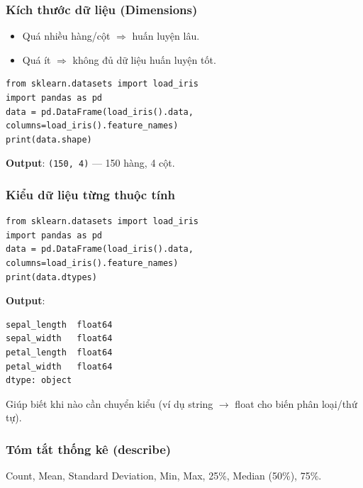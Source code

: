 \subsubsection{Kích thước dữ liệu (Dimensions)}

\begin{ynghia}[title={Vì sao cần biết số hàng/cột}]
\begin{itemize}
  \item Quá nhiều hàng/cột $\Rightarrow$ huấn luyện lâu.
  \item Quá ít $\Rightarrow$ không đủ dữ liệu huấn luyện tốt.
\end{itemize}
\end{ynghia}

\begin{vidu}[title={shape trên Iris}]
\begin{lstlisting}
from sklearn.datasets import load_iris
import pandas as pd
data = pd.DataFrame(load_iris().data, columns=load_iris().feature_names)
print(data.shape)
\end{lstlisting}
\textbf{Output}: \texttt{(150, 4)} --- 150 hàng, 4 cột.
\end{vidu}

\subsubsection{Kiểu dữ liệu từng thuộc tính}

\begin{vidu}[title={dtypes trên Iris}]
\begin{lstlisting}
from sklearn.datasets import load_iris
import pandas as pd
data = pd.DataFrame(load_iris().data, columns=load_iris().feature_names)
print(data.dtypes)
\end{lstlisting}
\textbf{Output}:
\begin{lstlisting}
sepal_length  float64
sepal_width   float64
petal_length  float64
petal_width   float64
dtype: object
\end{lstlisting}
Giúp biết khi nào cần chuyển kiểu (ví dụ string $\rightarrow$ float cho biến phân loại/thứ tự).
\end{vidu}

\subsubsection{Tóm tắt thống kê (describe)}

\begin{ynghia}[title={8 thống kê từ describe() cho mỗi cột số}]
Count, Mean, Standard Deviation, Min, Max, 25\%, Median (50\%), 75\%.
\end{ynghia}

